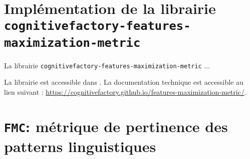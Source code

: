 \section{Implémentation de la librairie \\ \texttt{cognitivefactory-features-maximization-metric}}
\label{section:C.2-DESCRIPTION-IMPLEMENTATION-FEATURES-MAXIMIZATION-METRIC}
	
	La librairie \texttt{cognitivefactory-features-maximization-metric} ...
	
	\begin{leftBarInformation}
		La librairie est accessible dans \cite{schild:2023:cognitivefactory-featuresmaximizationmetric}.
		La documentation technique est accessible au lien suivant : \url{https://cognitivefactory.github.io/features-maximization-metric/}.
	\end{leftBarInformation}

	\section{\texttt{FMC}: métrique de pertinence des patterns linguistiques}
	\label{annex:C.2.1-DESCRIPTION-IMPLEMENTATION-FEATURES-MAXIMIZATION-METRIC-THEORIE}
